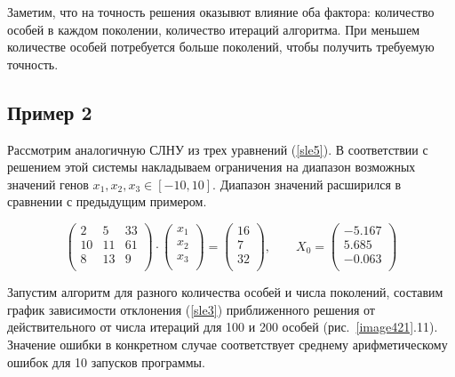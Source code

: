 \documentclass[12pt, a4paper]{article}
\begin{document}
    Заметим, что на точность решения оказывют влияние оба фактора: 
    количество особей в каждом поколении, количество итераций алгоритма. При 
    меньшем количестве особей потребуется больше поколений, чтобы получить 
    требуемую точность.
    
    \subsection{Пример 2}
    
    Рассмотрим аналогичную СЛНУ из трех уравнений (\ref{sle5}). В 
    соответствии с решением этой системы накладываем ограничения на диапазон 
    возможных значений генов $x_{1}, x_{2}, x_{3} \in [-10, 10]$. Диапазон 
    значений расширился в сравнении с предыдущим примером.
    
    \begin{equation}
        \left(
        \begin{array} {ccc}
            2 & 5 & 33 \\
            10 & 11 & 61 \\
            8 & 13 & 9 \\
        \end{array}
        \right)
        \cdot
        \left(
        \begin{array} {ccc}
            x_{1} \\
            x_{2} \\
            x_{3} \\
        \end{array}
        \right)
        =
        \left(
        \begin{array} {ccc}
            16 \\
            7 \\
            32 \\
        \end{array}
        \right), 
        \qquad
        X_{0} =
        \left(
        \begin{array} {ccc}
            -5.167 \\
            5.685 \\
            -0.063 \\
        \end{array}
        \right)
        \label{sle5}
    \end{equation}
    
    Запустим алгоритм для разного количества особей и числа поколений, 
    составим график зависимости отклонения (\ref{sle3}) приближенного 
    решения от действительного от числа итераций для 100 и 200 особей 
    (рис.~\ref{image421}.11). Значение ошибки в конкретном случае 
    соответствует среднему арифметическому ошибок для 10 запусков программы.
    
\end{document}
